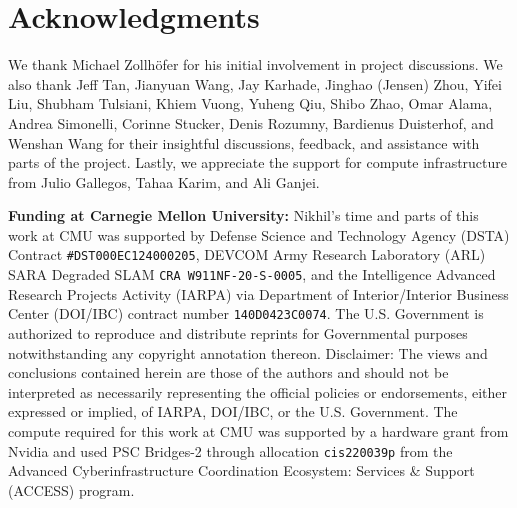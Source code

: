 \section{Acknowledgments}

We thank Michael Zollhöfer for his initial involvement in project discussions.
We also thank Jeff Tan, Jianyuan Wang, Jay Karhade, Jinghao (Jensen) Zhou, Yifei Liu, Shubham Tulsiani, Khiem Vuong, Yuheng Qiu, Shibo Zhao, Omar Alama, Andrea Simonelli, Corinne Stucker, Denis Rozumny, Bardienus Duisterhof, and Wenshan Wang for their insightful discussions, feedback, and assistance with parts of the project.
Lastly, we appreciate the support for compute infrastructure from Julio Gallegos, Tahaa Karim, and Ali Ganjei.

\vspace{0.4em}

\noindent\textbf{\textcolor{citegray}{Funding at Carnegie Mellon University:}} Nikhil's time and parts of this work at CMU was supported by Defense Science and Technology Agency (DSTA) Contract {\scriptsize\texttt{\#DST000EC124000205}}, DEVCOM Army Research Laboratory (ARL) SARA Degraded SLAM {\scriptsize\texttt{CRA W911NF-20-S-0005}}, and the Intelligence Advanced Research Projects Activity (IARPA) via Department of Interior/Interior Business Center (DOI/IBC) contract number {\scriptsize\texttt{140D0423C0074}}. The U.S. Government is authorized to reproduce and distribute reprints for Governmental purposes notwithstanding any copyright annotation thereon. Disclaimer: The views and conclusions contained herein are those of the authors and should not be interpreted as necessarily representing the official policies or endorsements, either expressed or implied, of IARPA, DOI/IBC, or the U.S. Government. 
The compute required for this work at CMU was supported by a hardware grant from Nvidia and used PSC Bridges-2 through allocation {\scriptsize\texttt{cis220039p}} from the Advanced Cyberinfrastructure Coordination Ecosystem: Services \& Support (ACCESS) program.
